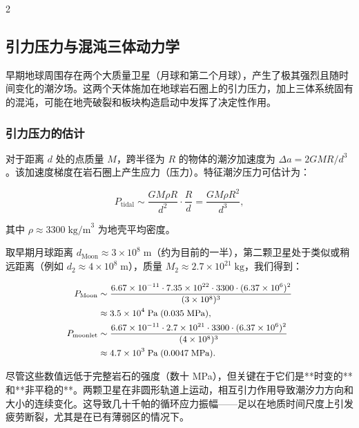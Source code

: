\documentclass[11pt,a4paper]{article}
\begin{document}
\begin{multicols}{2}
		\subsection{引力压力与混沌三体动力学}
		
		早期地球周围存在两个大质量卫星（月球和第二个月球），产生了极其强烈且随时间变化的潮汐场。这两个天体施加在地球岩石圈上的引力压力，加上三体系统固有的混沌，可能在地壳破裂和板块构造启动中发挥了决定性作用。
		
		\subsubsection{引力压力的估计}
		
		对于距离 \(d\) 处的点质量 \(M\)，跨半径为 \(R\) 的物体的潮汐加速度为 \(\Delta a = 2GM R / d^{3}\)。该加速度梯度在岩石圈上产生应力（压力）。特征潮汐压力可估计为：
		
		\[
		P_{\text{tidal}} \sim \frac{GM \rho R}{d^{2}} \cdot \frac{R}{d} = \frac{GM \rho R^{2}}{d^{3}},
		\]
		
		其中 \(\rho \approx 3300\;\text{kg/m}^{3}\) 为地壳平均密度。
		
		取早期月球距离 \(d_{\text{Moon}} \approx 3\times10^{8}\;\text{m}\)（约为目前的一半），第二颗卫星处于类似或稍远距离（例如 \(d_{2} \approx 4\times10^{8}\;\text{m}\)），质量 \(M_{2} \approx 2.7\times10^{21}\;\text{kg}\)，我们得到：
		
		\[
		\small
		\begin{aligned}
			P_{\text{Moon}} &\sim \frac{6.67\times10^{-11} \cdot 7.35\times10^{22} \cdot 3300 \cdot (6.37\times10^{6})^{2}}{(3\times10^{8})^{3}} \\
			&\approx 3.5 \times 10^{4}\;\text{Pa} \;(0.035\;\text{MPa}),\\
			P_{\text{moonlet}} &\sim \frac{6.67\times10^{-11} \cdot 2.7\times10^{21} \cdot 3300 \cdot (6.37\times10^{6})^{2}}{(4\times10^{8})^{3}} \\
			&\approx 4.7 \times 10^{3}\;\text{Pa} \;(0.0047\;\text{MPa}).
		\end{aligned}
		\]
		
		尽管这些数值远低于完整岩石的强度（数十 MPa），但关键在于它们是**时变的**和**非平稳的**。两颗卫星在非圆形轨道上运动，相互引力作用导致潮汐力方向和大小的连续变化。这导致几十千帕的循环应力振幅——足以在地质时间尺度上引发疲劳断裂，尤其是在已有薄弱区的情况下。
		

\end{multicols}
\end{document}

